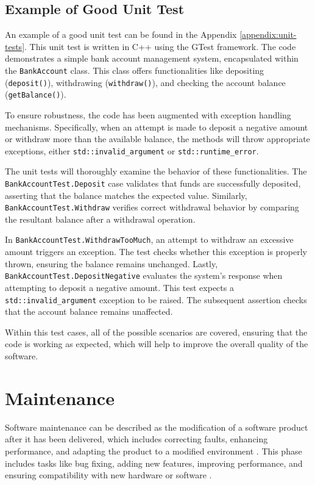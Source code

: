\subsection{Example of Good Unit Test}
\label{subsection:example_of_good_unit_test}

An example of a good unit test can be found in the Appendix \ref{appendix:unit-tests}. This unit test is written in C++ using the GTest framework. The code  demonstrates a simple bank account management system, encapsulated within the \texttt{BankAccount} class. This class offers functionalities like depositing (\texttt{deposit()}), withdrawing (\texttt{withdraw()}), and checking the account balance (\texttt{getBalance()}).

To ensure robustness, the code has been augmented with exception handling mechanisms. Specifically, when an attempt is made to deposit a negative amount or withdraw more than the available balance, the methods will throw appropriate exceptions, either \texttt{std::invalid\_argument} or \texttt{std::runtime\_error}.

The unit tests will thoroughly examine the behavior of these functionalities. The \texttt{BankAccountTest.Deposit} case validates that funds are successfully deposited, asserting that the balance matches the expected value. Similarly, \texttt{{BankAccountTest.Withdraw}} verifies correct withdrawal behavior by comparing the resultant balance after a withdrawal operation.

In \texttt{BankAccountTest.WithdrawTooMuch}, an attempt to withdraw an excessive amount triggers an exception. The test checks whether this exception is properly thrown, ensuring the balance remains unchanged. Lastly, \texttt{BankAccountTest.DepositNegative} evaluates the system's response when attempting to deposit a negative amount. This test expects a \texttt{std::invalid\_argument} exception to be raised. The subsequent assertion checks that the account balance remains unaffected.

Within this test cases, all of the possible scenarios are covered, ensuring that the code is working as expected, which will help to improve the overall quality of the software.

\section{Maintenance}

Software maintenance can be described as the modification of a software product after it has been delivered, which includes correcting faults, enhancing performance, and adapting the product to a modified environment \cite{Bhatt04}. This phase includes tasks like bug fixing, adding new features, improving performance, and ensuring compatibility with new hardware or software \cite{geeksforgeeks_2023b}.

